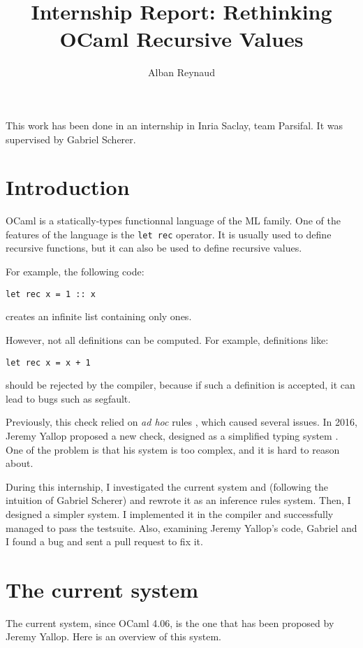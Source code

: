 \documentclass{article}
\title{Internship Report: Rethinking OCaml Recursive Values}
\author{Alban Reynaud}
\date{}
\begin{document}
\maketitle

This work has been done in an internship in Inria Saclay, team Parsifal. It was
supervised by Gabriel Scherer.


\section{Introduction}
OCaml is a statically-types functionnal language of the ML family. One of the
features of the language is the \lstinline|let rec| operator. It is usually
used to define recursive functions, but it can also be used to define recursive
values.

For example, the following code:
\begin{lstlisting}
let rec x = 1 :: x
\end{lstlisting}
creates an infinite list containing only ones.

However, not all definitions can be computed. For example, definitions like:
\begin{lstlisting}
let rec x = x + 1
\end{lstlisting}
should be rejected by the compiler, because if such a definition is accepted, it
can lead to bugs such as segfault. %

Previously, this check relied on \textit{ad hoc} rules \cite{PreviousRules},
which caused several issues. In 2016, Jeremy Yallop proposed a new check,
designed as a simplified typing system \cite{Yallop}. One of the problem is that
his system is too complex, and it is hard to reason about.

During this internship, I investigated the current system and (following the
intuition of Gabriel Scherer) and rewrote it as an inference rules system. Then,
I designed a simpler system. I implemented it in the compiler and successfully
managed to pass the testsuite. Also, examining Jeremy Yallop's code, Gabriel and
I found a bug and sent a pull request to fix it.

\section{The current system}
The current system, since OCaml 4.06, is the one that has been proposed by
Jeremy Yallop. Here is an overview of this system.
\end{document}
